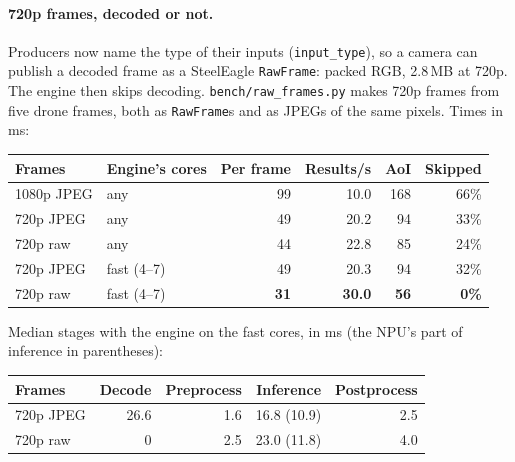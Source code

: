 \documentclass[11pt]{article}
\newcommand{\code}[1]{\texttt{#1}}
\begin{document}
\paragraph{720p frames, decoded or not.} Producers now name the type of their
inputs (\code{input\_type}), so a camera can publish a decoded frame as a
SteelEagle \code{RawFrame}: packed RGB, 2.8\,MB at 720p. The engine then
skips decoding. \code{bench/raw\_frames.py} makes 720p frames from five
drone frames, both as \code{RawFrame}s and as JPEGs of the same pixels.
Times in ms:
\begin{center}
\small
\begin{tabular}{@{}llrrrr@{}}
\toprule
Frames & Engine's cores & Per frame & Results/s & AoI & Skipped \\
\midrule
1080p JPEG & any        & 99 & 10.0 & 168 & 66\% \\
720p JPEG  & any        & 49 & 20.2 & 94  & 33\% \\
720p raw   & any        & 44 & 22.8 & 85  & 24\% \\
720p JPEG  & fast (4--7) & 49 & 20.3 & 94  & 32\% \\
720p raw   & fast (4--7) & \textbf{31} & \textbf{30.0} & \textbf{56} & \textbf{0\%} \\
\bottomrule
\end{tabular}
\end{center}
Median stages with the engine on the fast cores, in ms (the NPU's part of
inference in parentheses):
\begin{center}
\small
\begin{tabular}{@{}lrrrr@{}}
\toprule
Frames & Decode & Preprocess & Inference & Postprocess \\
\midrule
720p JPEG & 26.6 & 1.6 & 16.8 (10.9) & 2.5 \\
720p raw  & 0    & 2.5 & 23.0 (11.8) & 4.0 \\
\bottomrule
\end{tabular}
\end{center}
\end{document}
